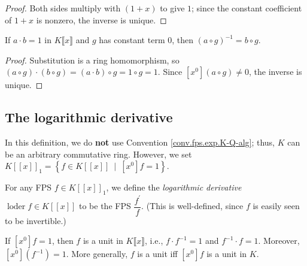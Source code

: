 \begin{proof}
\leanok
Both sides multiply with $(1+x)$ to give $1$; since the constant
coefficient of $1+x$ is nonzero, the inverse is unique.
\end{proof}

\begin{lemma}
\label{lem.fps.subst-inv}
\leanhelper
\leanok
If $a \cdot b = 1$ in $K\llbracket x \rrbracket$
and $g$ has constant term $0$, then $(a \circ g)^{-1} = b \circ g$.
\end{lemma}

\begin{proof}
\leanok
Substitution is a ring homomorphism, so $(a \circ g) \cdot (b \circ g) = (a \cdot b) \circ g = 1 \circ g = 1$.
Since $[x^0](a \circ g) \ne 0$, the inverse is unique.
\end{proof}

\subsection{The logarithmic derivative}

\begin{definition}
\label{def.fps.loder.1}
\leantarget
\leanok
In this definition, we do \textbf{not} use Convention
\ref{conv.fps.exp.K-Q-alg}; thus, $K$ can be an arbitrary commutative ring.
However, we set $K\left[\left[x\right]\right]_{1}=\left\{f\in
K\left[\left[x\right]\right]\ \mid\ \left[x^{0}\right]f=1\right\}
$.

For any FPS $f\in K\left[\left[x\right]\right]_{1}$, we define the
\emph{logarithmic derivative} $\operatorname{loder}f\in K\left[\left[
x\right]\right]$ to be the FPS $\dfrac{f^{\prime}}{f}$. (This is
well-defined, since $f$ is easily seen to be invertible.)
\end{definition}

\begin{lemma}
\label{lem.fps.isUnit-constantCoeff-one}
\leanhelper
\leanok
If $[x^0]f = 1$, then $f$ is a unit in $K\llbracket x \rrbracket$, i.e.,
$f \cdot f^{-1} = 1$ and $f^{-1} \cdot f = 1$.
Moreover, $[x^0](f^{-1}) = 1$.
More generally, $f$ is a unit iff $[x^0]f$ is a unit in $K$.
\end{lemma}

